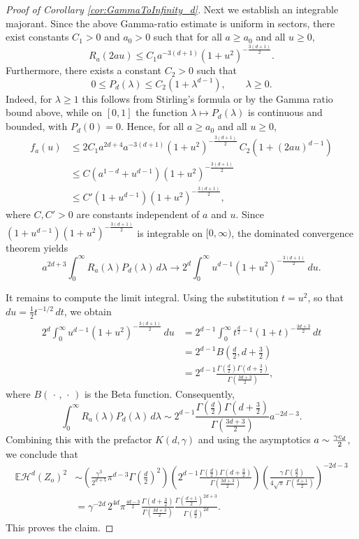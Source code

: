 \documentclass[11pt,a4paper]{article}
\theoremstyle{plain}
\theoremstyle{definition}
\theoremstyle{remark}
\def\EE{\mathbb{E}}
\def\cH{\mathcal{H}}
\begin{document}
\begin{proof}[Proof of Corollary \ref{cor:GammaToInfinity_d}]
	Next we establish an integrable majorant. Since the above Gamma-ratio estimate is uniform in sectors, there exist constants $C_1>0$ and $a_0>0$ such that for all $a\ge a_0$ and all $u\ge 0$,
	\[
	R_a(2au)\le C_1 a^{-3(d+1)}(1+u^2)^{-\frac{3(d+1)}{2}}.
	\]
	Furthermore, there exists a constant $C_2>0$ such that
	\[
	0\le P_d(\lambda)\le C_2(1+\lambda^{d-1}),
	\qquad \lambda\ge 0.
	\]
	Indeed, for $\lambda\ge 1$ this follows from Stirling's formula or by the Gamma ratio bound above, while on $[0,1]$ the function
	$\lambda\mapsto P_d(\lambda)$ is continuous and bounded, with $P_d(0)=0$.
	Hence, for all $a\ge a_0$ and all $u\ge 0$,
	\begin{align*}
		f_a(u)
		&\le
		2C_1a^{2d+4}a^{-3(d+1)}(1+u^2)^{-\frac{3(d+1)}{2}}\,C_2(1+(2au)^{d-1}) \\
		&\le
		C( a^{1-d}+u^{d-1})(1+u^2)^{-\frac{3(d+1)}{2}} \\
		&\le
		C'(1+u^{d-1})(1+u^2)^{-\frac{3(d+1)}{2}},
	\end{align*}
	where $C,C'>0$ are constants independent of $a$ and $u$. Since
	$(1+u^{d-1})(1+u^2)^{-\frac{3(d+1)}{2}}$
	is integrable on $[0,\infty)$, the dominated convergence theorem yields
	\[
	a^{2d+3}\int_0^\infty R_a(\lambda)P_d(\lambda)\,d\lambda
	\longrightarrow
	2^d\int_0^\infty u^{d-1}(1+u^2)^{-\frac{3(d+1)}{2}}\,du.
	\]

	It remains to compute the limit integral. Using the substitution $t=u^2$, so that
	$du=\frac12 t^{-1/2}\,dt$, we obtain
	\begin{align*}
		2^d\int_0^\infty u^{d-1}(1+u^2)^{-\frac{3(d+1)}{2}}\,du
		&=
		2^{d-1}\int_0^\infty t^{\frac d2-1}(1+t)^{-\frac{3d+3}{2}}\,dt \\
		&=
		2^{d-1}B\!\left(\frac d2,d+\frac32\right) \\
		&=
		2^{d-1}\frac{\Gamma\!\left(\frac d2\right)\Gamma\!\left(d+\frac32\right)}{
			\Gamma\!\left(\frac{3d+3}{2}\right)},
	\end{align*}
    where $B(\,\cdot\,,\,\cdot\,)$ is the Beta function.
	Consequently,
	\[
	\int_0^\infty R_a(\lambda)P_d(\lambda)\,d\lambda
	\sim
	2^{d-1}\frac{\Gamma\!\left(\frac d2\right)\Gamma\!\left(d+\frac32\right)}{
		\Gamma\!\left(\frac{3d+3}{2}\right)}
	a^{-2d-3}.
	\]
	Combining this with the prefactor $K(d,\gamma)$ and using the asymptotics $a\sim{\gamma c_d\over 2}$,
	we conclude that
	\begin{align*}
		\EE\cH^d(Z_o)^2
		&\sim
		\left(\frac{\gamma^3}{2^{d+5}}\pi^{d-3}\Gamma\!\left(\frac d2\right)^2\right)
		\left(
		2^{d-1}\frac{\Gamma\!\left(\frac d2\right)\Gamma\!\left(d+\frac32\right)}{
			\Gamma\!\left(\frac{3d+3}{2}\right)}
		\right)
		\left(
		\frac{\gamma\,\Gamma\!\left(\frac d2\right)}{
			4\sqrt{\pi}\,\Gamma\!\left(\frac{d+1}{2}\right)}
		\right)^{-2d-3} \\
		&=
		\gamma^{-2d}\,
		2^{4d}\pi^{\frac{4d-3}{2}}
		\frac{\Gamma\!\left(d+\frac32\right)}{\Gamma\!\left(\frac{3d+3}{2}\right)}
		\frac{\Gamma\!\left(\frac{d+1}{2}\right)^{2d+3}}{
			\Gamma\!\left(\frac d2\right)^{2d}}.
	\end{align*}
	This proves the claim.
\end{proof}
\end{document}

